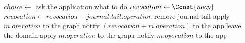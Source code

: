 \documentclass[preview]{standalone}
\begin{document}
  \pagecolor{white}
  \begin{algorithmic}[1]
        \State $choice\gets$ ask the application what to do
          \State $revocation\gets \Const{noop}$
          \Repeat
            \State $revocation\gets revocation - journal.tail.operation$
            \State remove journal tail
          \State apply $m.operation$ to the graph
          \State notify $(revocation + m.operation)$ to the app
          \State leave the domain
        \EndIf
      \Else
        \State apply $m.operation$ to the graph
        \State notify $m.operation$ to the app
      \EndIf
    \EndProcedure
  \end{algorithmic}
\end{document}
